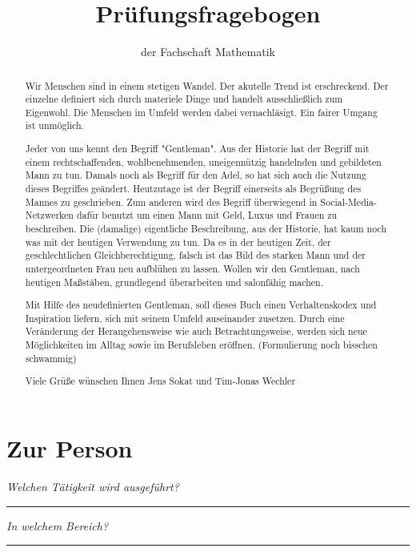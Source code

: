 \documentclass[a4paper,12pt]{scrartcl}
\newcommand{\hfilloutline}[1]{\rule{#1}{0.5pt}}
\newcommand{\frage}[1]{\textit{#1}}
\begin{document}
\title{Prüfungsfragebogen}
\author{der Fachschaft Mathematik}
\date{}
\maketitle

\begin{abstract}
    Wir Menschen sind in einem stetigen Wandel. Der akutelle Trend ist erschreckend. Der einzelne definiert sich durch materiele Dinge und handelt ausschließlich zum Eigenwohl. Die Menschen im Umfeld werden dabei vernachläsigt. Ein fairer Umgang ist unmöglich.\par\smallskip

    Jeder von uns kennt den Begriff "Gentleman". Aus der Historie hat der Begriff mit einem rechtschaffenden, wohlbenehmenden, uneigennützig handelnden und gebildeten Mann zu tun. Damals noch als Begriff für den Adel, so hat sich auch die Nutzung dieses Begriffes geändert. Heutzutage ist der Begriff einerseits als Begrüßung des Mannes zu geschrieben. Zum anderen wird des Begriff überwiegend in Social-Media-Netzwerken dafür benutzt um einen Mann mit Geld, Luxus und Frauen zu beschreiben. Die (damalige) eigentliche Beschreibung, aus der Historie, hat kaum noch was mit der heutigen Verwendung zu tun. 
    Da es in der heutigen Zeit, der geschlechtlichen Gleichberechtigung, falsch ist das Bild des starken Mann und der untergeordneten Frau neu aufblühen zu lassen. Wollen wir den Gentleman, nach heutigen Maßstäben, grundlegend überarbeiten und salonfähig machen.\par\smallskip 
    
    Mit Hilfe des neudefinierten Gentleman, soll dieses Buch einen Verhaltenskodex und Inspiration liefern, sich mit seinem Umfeld  auseinander zusetzen. Durch eine Veränderung der Herangehensweise wie auch Betrachtungsweise, werden sich neue Möglichkeiten im Alltag sowie im Berufsleben eröffnen. (Formulierung noch bisschen schwammig)
    
    Viele Grüße wünschen Ihnen
    Jens Sokat und Tim-Jonas Wechler
\end{abstract}

\section*{Zur Person}

\frage{Welchen Tätigkeit wird ausgeführt?}
\hfill\hfilloutline{9cm}


\frage{In welchem Bereich?}
\hfill\hfilloutline{9cm}
\end{document}
